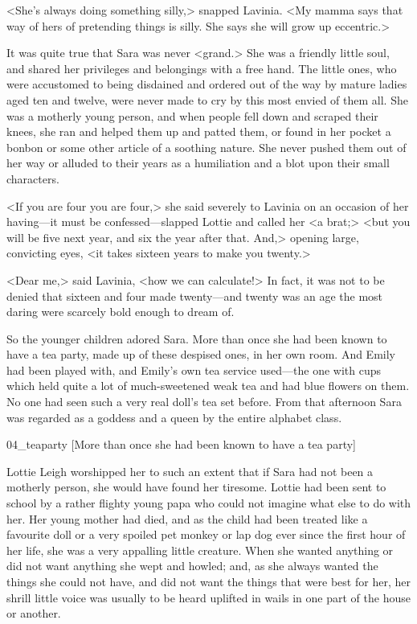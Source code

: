 <She's always doing something silly,> snapped Lavinia. <My mamma says that way of hers of pretending things is silly. She says she will grow up eccentric.>

It was quite true that Sara was never <grand.> She was a friendly little soul, and shared her privileges and belongings with a free hand. The little ones, who were accustomed to being disdained and ordered out of the way by mature ladies aged ten and twelve, were never made to cry by this most envied of them all. She was a motherly young person, and when people fell down and scraped their knees, she ran and helped them up and patted them, or found in her pocket a bonbon or some other article of a soothing nature. She never pushed them out of her way or alluded to their years as a humiliation and a blot upon their small characters.

<If you are four you are four,> she said severely to Lavinia on an occasion of her having—it must be confessed—slapped Lottie and called her <a brat;> <but you will be five next year, and six the year after that. And,> opening large, convicting eyes, <it takes sixteen years to make you twenty.>

<Dear me,> said Lavinia, <how we can calculate!> In fact, it was not to be denied that sixteen and four made twenty—and twenty was an age the most daring were scarcely bold enough to dream of.

So the younger children adored Sara. More than once she had been known to have a tea party, made up of these despised ones, in her own room. And Emily had been played with, and Emily's own tea service used—the one with cups which held quite a lot of much-sweetened weak tea and had blue flowers on them. No one had seen such a very real doll's tea set before. From that afternoon Sara was regarded as a goddess and a queen by the entire alphabet class.

\begin{colorbigpic}
	[\basicscale]
	{04_teaparty}
	[More than once she had been known to have a tea party]
\end{colorbigpic}

Lottie Leigh worshipped her to such an extent that if Sara had not been a motherly person, she would have found her tiresome. Lottie had been sent to school by a rather flighty young papa who could not imagine what else to do with her. Her young mother had died, and as the child had been treated like a favourite doll or a very spoiled pet monkey or lap dog ever since the first hour of her life, she was a very appalling little creature. When she wanted anything or did not want anything she wept and howled; and, as she always wanted the things she could not have, and did not want the things that were best for her, her shrill little voice was usually to be heard uplifted in wails in one part of the house or another.

